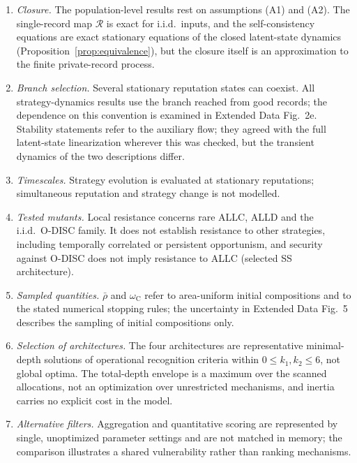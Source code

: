 \documentclass[fleqn,10pt]{article}
\theoremstyle{plain}
\theoremstyle{remark}
\newcommand{\EDResident}{2}
\newcommand{\EDRatio}{5}
\newcommand{\Rm}{\mathcal R}
\newcommand{\C}{\mathrm C}
\begin{document}
\begin{enumerate}
\item \emph{Closure.} The population-level results rest on assumptions (A1)
and (A2). The single-record map $\Rm$ is exact for i.i.d.\ inputs, and the
self-consistency equations are exact stationary equations of the closed
latent-state dynamics (Proposition~\ref{prop:equivalence}), but the closure
itself is an approximation to the finite private-record process.
\item \emph{Branch selection.} Several stationary reputation states can coexist.
All strategy-dynamics results use the branch reached from good records; the
dependence on this convention is examined in Extended Data
Fig.~\EDResident e. Stability statements refer to the auxiliary flow; they agreed
with the full latent-state linearization wherever this was checked, but the
transient dynamics of the two descriptions differ.
\item \emph{Timescales.} Strategy evolution is evaluated at stationary
reputations; simultaneous reputation and strategy change is not modelled.
\item \emph{Tested mutants.} Local resistance concerns rare ALLC, ALLD and the
i.i.d.\ O-DISC family. It does not establish resistance to other strategies,
including temporally correlated or persistent opportunism, and security against
O-DISC does not imply resistance to ALLC (selected SS architecture).
\item \emph{Sampled quantities.} $\bar\rho$ and $\omega_\C$ refer to area-uniform
initial compositions and to the stated numerical stopping rules; the
uncertainty in Extended Data Fig.~\EDRatio{} describes the sampling of initial
compositions only.
\item \emph{Selection of architectures.} The four architectures are
representative minimal-depth solutions of operational recognition criteria
within $0\le k_1,k_2\le6$, not global optima. The total-depth envelope is a
maximum over the scanned allocations, not an optimization over unrestricted
mechanisms, and inertia carries no explicit cost in the model.
\item \emph{Alternative filters.} Aggregation and quantitative scoring are
represented by single, unoptimized parameter settings and are not matched in
memory; the comparison illustrates a shared vulnerability rather than ranking
mechanisms.
\end{enumerate}
\end{document}
